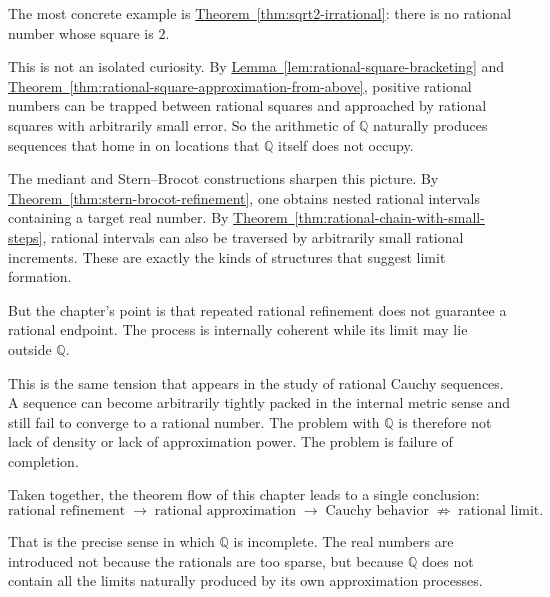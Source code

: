 \begin{remark}
The most concrete example is
\hyperref[thm:sqrt2-irrational]{Theorem~\ref*{thm:sqrt2-irrational}}:
there is no rational number whose square is $2$.

This is not an isolated curiosity. By
\hyperref[lem:rational-square-bracketing]{Lemma~\ref*{lem:rational-square-bracketing}}
and
\hyperref[thm:rational-square-approximation-from-above]{Theorem~\ref*{thm:rational-square-approximation-from-above}},
positive rational numbers can be trapped between rational squares and
approached by rational squares with arbitrarily small error. So the
arithmetic of $\mathbb{Q}$ naturally produces sequences that home in on
locations that $\mathbb{Q}$ itself does not occupy.
\end{remark}

\begin{remark}
The mediant and Stern--Brocot constructions sharpen this picture.
By
\hyperref[thm:stern-brocot-refinement]{Theorem~\ref*{thm:stern-brocot-refinement}},
one obtains nested rational intervals containing a target real number.
By
\hyperref[thm:rational-chain-with-small-steps]{Theorem~\ref*{thm:rational-chain-with-small-steps}},
rational intervals can also be traversed by arbitrarily small rational
increments. These are exactly the kinds of structures that suggest
limit formation.

But the chapter's point is that repeated rational refinement does not
guarantee a rational endpoint. The process is internally coherent while
its limit may lie outside $\mathbb{Q}$.
\end{remark}

\begin{remark}
This is the same tension that appears in the study of rational Cauchy
sequences. A sequence can become arbitrarily tightly packed in the
internal metric sense and still fail to converge to a rational number.
The problem with $\mathbb{Q}$ is therefore not lack of density or lack
of approximation power. The problem is failure of completion.
\end{remark}

\begin{remark}
Taken together, the theorem flow of this chapter leads to a single
conclusion:
\[
\text{rational refinement}
\;\longrightarrow\;
\text{rational approximation}
\;\longrightarrow\;
\text{Cauchy behavior}
\;\not\Longrightarrow\;
\text{rational limit}.
\]

That is the precise sense in which $\mathbb{Q}$ is incomplete.
The real numbers are introduced not because the rationals are too
sparse, but because $\mathbb{Q}$ does not contain all the limits
naturally produced by its own approximation processes.
\end{remark}

